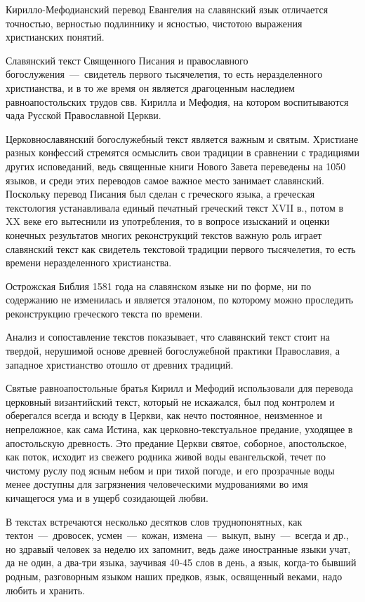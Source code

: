 \documentclass[11pt,a4paper,oneside]{memoir}
\begin{document}
    Кирилло-Мефодианский перевод Евангелия на славянский язык отличается точностью, верностью подлиннику и ясностью, чистотою выражения христианских понятий.
    
    Славянский текст Священного Писания и православного богослужения~---~свидетель первого тысячелетия, то есть неразделенного христианства, и в то же время он является драгоценным наследием равноапостольских трудов свв. Кирилла и Мефодия, на котором воспитываются чада Русской Православной Церкви.
    
    Церковнославянский богослужебный текст является важным и святым. Христиане разных конфессий стремятся осмыслить свои традиции в сравнении с традициями других исповеданий, ведь священные книги Нового Завета переведены на 1050 языков, и среди этих переводов самое важное место занимает славянский. Поскольку перевод Писания был сделан с греческого языка, а греческая текстология устанавливала единый печатный греческий текст XVII в., потом в XX веке его вытеснили из употребления, то в вопросе изысканий и оценки конечных результатов многих реконструкций текстов важную роль играет славянский текст как свидетель текстовой традиции первого тысячелетия, то есть времени неразделенного христианства.
    
    Острожская Библия 1581 года на славянском языке ни по форме, ни по содержанию не изменилась и является эталоном, по которому можно проследить реконструкцию греческого текста по времени.
    
    Анализ и сопоставление текстов показывает, что славянский текст стоит на твердой, нерушимой основе древней богослужебной практики Православия, а западное христианство отошло от древних традиций.
    
    Святые равноапостольные братья Кирилл и Мефодий использовали для перевода церковный византийский текст, который не искажался, был под контролем и оберегался всегда и всюду в Церкви, как нечто постоянное, неизменное и непреложное, как сама Истина, как церковно-текстуальное предание, уходящее в апостольскую древность. Это предание Церкви святое, соборное, апостольское, как поток, исходит из свежего родника живой воды евангельской, течет по чистому руслу под ясным небом и при тихой погоде, и его прозрачные воды менее доступны для загрязнения человеческими мудрованиями во имя кичащегося ума и в ущерб созидающей любви.
    
    В текстах встречаются несколько десятков слов труднопонятных, как тектон~---~дровосек, усмен~---~кожан, измена~---~выкуп, выну~---~всегда и др., но здравый человек за неделю их запомнит, ведь даже иностранные языки учат, да не один, а два-три языка, заучивая 40-45 слов в день, а язык, когда-то бывший родным, разговорным языком наших предков, язык, освященный веками, надо любить и хранить.
    
\end{document}
